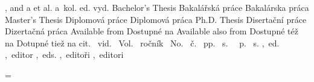 \ifx\upper\undefined 
   \ifx\sc\undefined \def\upper{\uppercase\expandafter}\else {}\fi
\fi


\def\setbibmark{%
   \ifx\dobibmark\undefined \def\dobibmark{}\fi
   \RetrieveFieldIn{bibmark}\tmp
   \ifx\tmp\empty \RetrieveFieldIn{year}\tmp \edef\tmp{\dobibmark, \tmp}\fi
   \bibmark=\expandafter{\tmp}%
}


            {, and }               { a }               {}
           { et al.}              { a~kol.}           {}
        { ed.}                 { vyd.}             {}
     {Bachelor's Thesis}    {Bakalářská práce}  {Bakalárska práca}
      {Master's Thesis}      {Diplomová práce}   {Diplomová práca}
      {Ph.D. Thesis}         {Disertační práce}  {Dizertačná práca}
      {Available from }      {Dostupné na }      {}
  {Available also from } {Dostupné též na }  {Dotupné tiež na }
       {cit.~}                {vid.~}             {}
         {Vol.~}                {ročník~}           {}
         {No.~}                 {č.~}               {}
       {pp.~}                 {s.~}               {}
      {~p.}                  {~s.}               {}
         {,~ed.}                {,~editor}          {}
        {,~eds.}               {,~editoři}         {,~editori}


\def\bibconjunctionand{\Mtext{bib.and}}
\def\preurl{\Mtext{bib.available}}
\let\predoi=\preurl
\def\postedition{\mtext{bib.edition}}
\def\Inclause{In:~}
\def\prevolume{\mtext{bib.volume}}
\def\prenumber{\mtext{bib.number}}
\def\prepages{\mtext{bib.prepages}}
\def\posteditor{\ifnum0\namecountraw>1 \Mtext{bib.editors}\else\Mtext{bib.editor}\fi}


\chardef\documentlanguage=\language
\def\Mtext#1{\csname mt:#1:\csname lan:\the\documentlanguage\endcsname\endcsname}

\def\setlang#1{\ifx#1\empty \else 
      \expandafter \ifx \csname #1Patt\endcsname \relax
         \opwarning{The language "#1" used in .bib file is unknown}
      \else \language=\csname #1Patt\endcsname
   \fi\fi
}
\ifx\USenglish\undefined  \chardef{} \fi
\let\enPatt=\USenglish  \let\usPatt=\USenglish
\ifx\csPatt \undefined \let\csPatt=\czPatt \else \let\czPatt=\csPatt \fi

